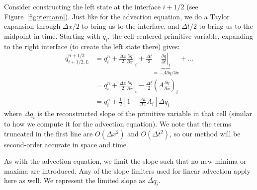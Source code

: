 Consider constructing the left state at the interface $i+1/2$ (see
Figure~\ref{fig:riemann}).  Just like for the advection equation, we
do a Taylor expansion through $\Delta x/2$ to bring us to the
interface, and $\Delta t/2$ to bring us to the midpoint in time.
Starting with $q_i$, the cell-centered primitive variable, expanding
to the right interface (to create the left state there) gives:
\begin{align}
q_{i+1/2,L}^{n+1/2} &= q_i^n +
    \left . \frac{\Delta x}{2} \frac{\partial q}{\partial x} \right |_i +
    \frac{\Delta t}{2} \underbrace{\left .\frac{\partial q}{\partial t} \right |_i}_{= -A \partial q / \partial x} + \ldots \\
&= q_i^n + \frac{\Delta x}{2} \left . \frac{\partial q}{\partial x} \right |_i
          - \frac{\Delta t}{2} \left ( A \frac{\partial q}{\partial x} \right )_i\\
&= q_i^n + \frac{1}{2} \left [ 1 - \frac{\Delta t}{\Delta x} A_i \right ] \Delta q_i \label{eq:taylorstate}
\end{align}
where $\Delta q_i$ is the reconstructed slope of the primitive
variable in that cell (similar to how we compute it for the advection
equation).  We note that the terms truncated in the first line are
$O(\Delta x^2)$ and $O(\Delta t^2)$, so our method will be second-order
accurate in space and time.

As with the advection equation, we limit the slope such that no new minima
or maxima are introduced.  Any of the slope limiters used for linear advection
apply here as well.  We represent the limited slope as $\overline{\Delta q}_i$.

